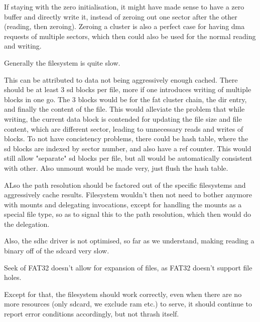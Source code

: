 If staying with the zero initialisation, it might have made sense to have a zero
buffer and directly write it, instead of zeroing out one sector after the other
(reading, then zeroing).
Zeroing a cluster is also a perfect case for having dma requests of multiple
sectors, which then could also be used for the normal reading and writing.

Generally the filesystem is quite slow.

This can be attributed to data not being aggressively enough cached.
There should be at least 3 sd blocks per file, more if one introduces writing of
multiple blocks in one go.
The 3 blocks would be for the fat cluster chain, the dir entry, and finally the
content of the file.
This would alleviate the problem that while writing, the current data block is
contended for updating the file size and file content, which are different
sector, leading to unnecessary reads and writes of blocks.
To not have concistency problems, there could be hash table, where the sd blocks
are indexed by sector number, and also have a ref counter.
This would still allow "separate" sd blocks per file, but all would be
automatically consistent with other.
Also unmount would be made very, just flush the hash table.

ALso the path resolution should be factored out of the specific filesystems and
aggressively cache results.
Filesystem wouldn't then not need to bother anymore with mounts and delegating
invocations, except for handling the mounts as a special file type, so as to
signal this to the path resolution, which then would do the delegation.

Also, the sdhc driver is not optimised, so far as we understand, making reading
a binary off of the sdcard very slow.

Seek of FAT32 doesn't allow for expansion of files, as FAT32 doesn't support
file holes.

Except for that, the filesystem should work correctly, even when there are no
more resources (only sdcard, we exclude ram etc.) to serve, it should continue
to report error conditions accordingly, but not thrash itself.
